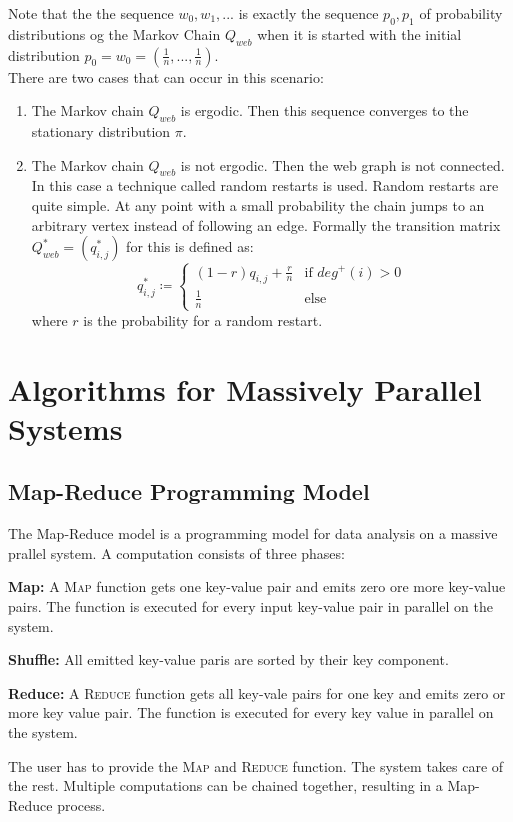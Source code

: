 \documentclass[english]{panikzettel}
\begin{document}
Note that the the sequence $w_0,w_1,...$ is exactly the sequence $p_0,p_1$ of probability distributions og the Markov Chain $Q_{web}$ when it is started with the initial distribution $p_0=w_0=(\frac{1}{n},...,\frac{1}{n})$.\\
There are two cases that can occur in this scenario:
\begin{enumerate}
\item The Markov chain $Q_{web}$ is ergodic. Then this sequence converges to the stationary distribution $\pi$.
\item The Markov chain $Q_{web}$ is not ergodic. Then the web graph is not connected. In this case a technique called random restarts is used. Random restarts are quite simple. At any point with a small probability the chain jumps to an arbitrary vertex instead of following an edge. Formally the transition matrix $Q_{web}^*=(q_{i,j}^*)$ for this is defined as:
\[
q_{i,j}^*\coloneqq
\begin{cases}
(1-r)q_{i,j}+\frac{r}{n} & \text{if } deg^+(i)>0\\
\frac{1}{n} & \text{else}
\end{cases}
\]
where $r$ is the probability for a random restart.
\end{enumerate}


\section{Algorithms for Massively Parallel Systems}
\subsection{Map-Reduce Programming Model}
The Map-Reduce model is a programming model for data analysis on a massive prallel system.
A computation consists of three phases:

\textbf{Map:} A \textsc{Map} function gets one key-value pair and emits zero ore more key-value pairs. The function is executed for every input key-value pair in parallel on the system.

\textbf{Shuffle:} All emitted key-value paris are sorted by their key component.

\textbf{Reduce:} A \textsc{Reduce} function gets all key-vale pairs for one key and emits zero or more key value pair. The function is executed for every key value in parallel on the system.

The user has to provide the \textsc{Map} and \textsc{Reduce} function. The system takes care of the rest.
Multiple computations can be chained together, resulting in a Map-Reduce process.
\end{document}
